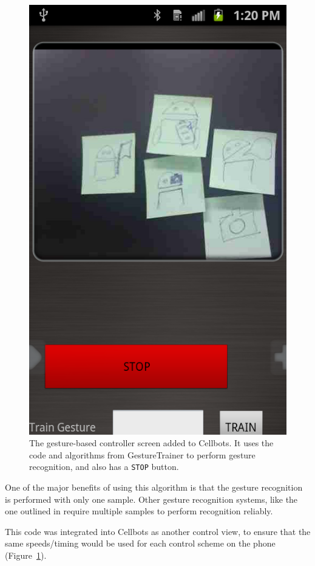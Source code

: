 \documentclass[12pt, letterpaper]{report}
\begin{document}
\begin{figure}[h!]
	\centering
	\includegraphics[scale=0.2]{images/gesture}
	\caption{The gesture-based controller screen added to Cellbots. It uses the code and algorithms from GestureTrainer to perform gesture recognition, and also has a \texttt{STOP} button.}
	\label{gesture_cellbots}
\end{figure}


One of the major benefits of using this algorithm is that the gesture recognition is performed with only one sample. Other gesture recognition systems, like the one outlined in \cite{Rubine} require multiple samples to perform recognition reliably.

This code was integrated into Cellbots as another control view, to ensure that the same speeds/timing would be used for each control scheme on the phone  (Figure~\ref{gesture_cellbots}).
\end{document}
